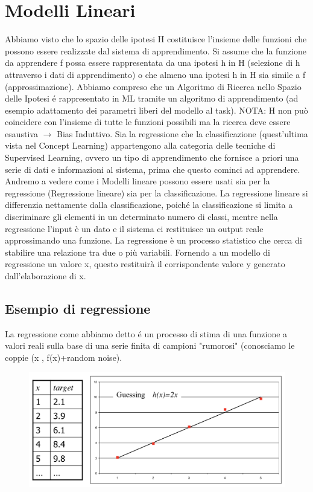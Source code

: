 \documentclass{article}
\begin{document}
\section{Modelli Lineari}
Abbiamo visto che lo spazio delle ipotesi H costituisce l’insieme delle funzioni che possono essere realizzate dal sistema di apprendimento. Si assume che la funzione da apprendere f possa essere rappresentata da una ipotesi h in H (selezione di h attraverso i dati di apprendimento) o che almeno una ipotesi h in H sia simile a f (approssimazione). Abbiamo compreso che un Algoritmo di Ricerca nello Spazio delle Ipotesi é rappresentato in ML tramite un algoritmo di apprendimento (ad esempio adattamento dei parametri liberi del modello al task). NOTA: H non può coincidere con l’insieme di tutte le funzioni possibili ma la ricerca deve essere esaustiva $\rightarrow$ Bias Induttivo. \newline
Sia la regressione che la classificazione (quest'ultima vista nel Concept Learning) appartengono alla categoria delle tecniche di Supervised Learning, ovvero un tipo di apprendimento che fornisce a priori una serie di dati e informazioni al sistema, prima che questo cominci ad apprendere. Andremo a vedere come i Modelli lineare possono essere usati sia per la regressione (Regressione lineare) sia per la classificazione. La regressione lineare si differenzia nettamente dalla classificazione, poiché la classificazione si limita a discriminare gli elementi in un determinato numero di classi, mentre nella regressione l’input è un dato e il sistema ci restituisce un output reale approssimando una funzione. La regressione è un processo statistico che cerca di stabilire una relazione tra due o più variabili. Fornendo a un modello di regressione un valore x, questo restituirà il corrispondente valore y generato dall'elaborazione di x.

\subsection{Esempio di regressione}
La regressione come abbiamo detto é un processo di stima di una funzione a valori reali sulla base di una serie finita di campioni "rumorosi" (conosciamo le coppie (x , f(x)+random noise).
\begin{figure}[H]
    \centering
    \includegraphics[scale=0.4]{Images/esempioregressione.png}
\end{figure}
\end{document}
